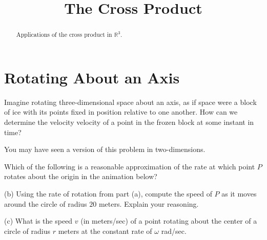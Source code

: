 \documentclass{ximera}
\title{The Cross Product}
\begin{document}
\begin{abstract}
Applications of the cross product in $\mathbb{R}^3$.
\end{abstract}
\maketitle

\section{Rotating About an Axis}

Imagine rotating three-dimensional space about an axis, as if space were a block of ice with its points fixed in position relative to one another. How can we determine the velocity velocity of a point in the frozen block at some instant in time?

You may have seen a version of this problem in two-dimensions.


\begin{exploration}  \label{Qdstsdfgf:Cross}

\begin{question}   \label{Qdfg4bk:Cross}
Which of the following is a reasonable approximation of the rate at which point $P$ rotates about the origin in the animation below?
\begin{multipleChoice}  
\end{multipleChoice}  
\end{question}


(b) Using the rate of rotation from part (a), compute the speed of $P$ as it moves around the circle of radius $20$ meters. Explain your reasoning.

(c) What is the speed $v$ (in meters/sec) of a point rotating about the center of a circle of radius $r$ meters at the constant rate of $\omega$ rad/sec.

 
\begin{onlineOnly}
    \begin{center}
\end{center}
\end{onlineOnly}




\end{exploration}
\end{document}

